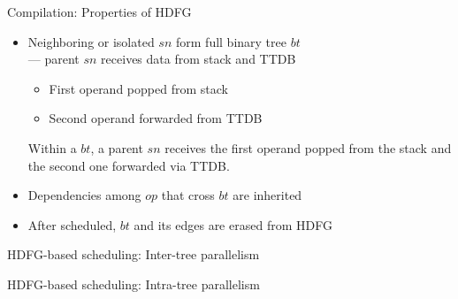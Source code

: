 \documentclass{beamer}
\begin{document}
\begin{CJK}{UTF8}{bkai}
\begin{frame}{Compilation: Properties of HDFG}
\begin{itemize}
            \item Neighboring or isolated $sn$ form full binary tree $bt$ \\
                --- parent $sn$ receives data from stack and TTDB
                \begin{itemize}
                    \item First operand popped from stack
                    \item Second operand forwarded from TTDB
                \end{itemize}
                Within a $bt$, a parent $sn$ receives the first operand popped from the stack and the second one forwarded via TTDB.
            \item Dependencies among $op$ that cross $bt$ are inherited
            \item After scheduled, $bt$ and its edges are erased from HDFG
        \end{itemize}
    \end{frame}



    \begin{frame}{HDFG-based scheduling: Inter-tree parallelism}
    \end{frame}

    \begin{frame}{HDFG-based scheduling: Intra-tree parallelism}

    \end{frame}


\end{CJK}
\end{document}
